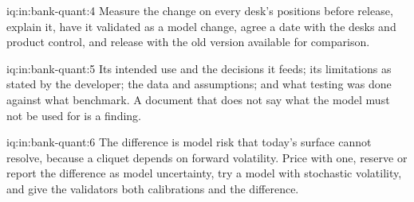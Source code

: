 \begin{solution}{iq:in:bank-quant:4}
Measure the change on every desk's positions before release, explain it, have it validated as a model change, agree a date
with the desks and product control, and release with the old version available for comparison.
\end{solution}

\begin{solution}{iq:in:bank-quant:5}
Its intended use and the decisions it feeds; its limitations as stated by the developer; the data and assumptions; and what
testing was done against what benchmark. A document that does not say what the model must not be used for is a finding.
\end{solution}

\begin{solution}{iq:in:bank-quant:6}
The difference is model risk that today's surface cannot resolve, because a cliquet depends on forward volatility.
Price with one, reserve or report the difference as model uncertainty, try a model with stochastic volatility, and give
the validators both calibrations and the difference.
\end{solution}
